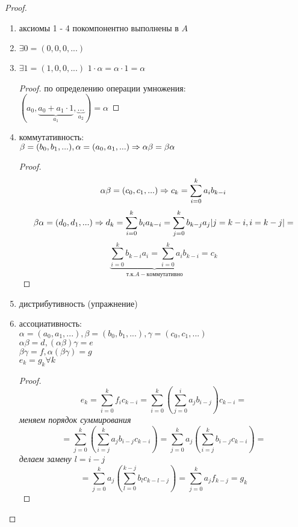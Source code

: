 	\begin{proof}
		\begin{enumerate}
			\item аксиомы 1 - 4 покомпонентно выполнены в $A$
			\item $\exists 0 = (0, 0, 0, ...)$
			\item $\exists 1 = (1, 0, 0, ...)$ 
				$ 1 \cdot \alpha = \alpha \cdot 1 = \alpha $
			\begin{proof}
				по определению операции умножения:\\
				$ (a_0, \underbrace{a_0 + a_1 \cdot 1}_{a_1}, \underbrace{...}_{a_2}) = \alpha $
			\end{proof}
			\item коммутативность:\\
			$\beta = (b_0, b_1, ...), \alpha = (a_0, a_1, ...) \Rightarrow \alpha\beta = \beta\alpha$
			\begin{proof}
				$$ \alpha\beta = (c_0, c_1, ...) \Rightarrow c_k = \sum_{i = 0}^k a_ib_{k - i} $$
				$$ \beta\alpha = (d_0, d_1, ...) \Rightarrow d_k = \sum_{i = 0}^k b_ia_{k - i} = \sum_{j = 0}^k b_{k - j}a_j
				|j = k - i, i = k - j| =$$
				$$ \underbrace{\sum_{i = 0}^k b_{k - i}a_i  = \sum_{i = 0}^k a_ib_{k - i}}_{т.к. A - коммутативно} = c_k $$
			\end{proof}
			\item дистрибутивность (упражнение)
			\item ассоциативность:\\
			$\alpha = (a_0, a_1, ...), \beta = (b_0, b_1, ...), \gamma = (c_0, c_1, ...)$\\
			$\alpha\beta = d, (\alpha\beta)\gamma = e$\\
			$\beta\gamma = f, \alpha(\beta\gamma) = g$\\
			$e_k = g_k \forall k$
			\begin{proof}
				$$ e_k = \sum_{i = 0}^k f_ic_{k-i} = \sum_{i = 0}^k(\sum_{j = 0}^i a_jb_{i-j})c_{k-i} = $$
				\textit{меняем порядок суммирования}
				$$ = \sum_{j = 0}^k(\sum_{i = j}^k a_jb_{i - j}c_{k - i}) = \sum_{j = 0}^k a_j(\sum_{i = j}^k b_{i - j}c_{k - i}) = $$
				\textit{делаем замену $l = i - j$}
				$$ = \sum_{j = 0}^k a_j(\sum_{l = 0}^{k - j} b_lc_{k - l - j}) = \sum_{j = 0}^k a_jf_{k-j} = g_k$$
			\end{proof}
		\end{enumerate}
	\end{proof}
